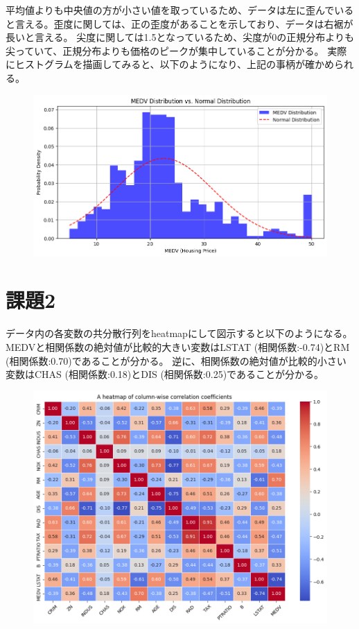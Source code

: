 \documentclass{jsarticle}
\begin{document}
平均値よりも中央値の方が小さい値を取っているため、データは左に歪んでいると言える。歪度に関しては、正の歪度があることを示しており、データは右裾が長いと言える。
尖度に関しては1.5となっているため、尖度が0の正規分布よりも尖っていて、正規分布よりも価格のピークが集中していることが分かる。
実際にヒストグラムを描画してみると、以下のようになり、上記の事柄が確かめられる。\\
\begin{figure}[H]
  \centering
  \includegraphics[width=15cm]{histogram.png}
\end{figure}

\section{課題2}
データ内の各変数の共分散行列をheatmapにして図示すると以下のようになる。 \\
MEDVと相関係数の絶対値が比較的大きい変数はLSTAT (相関係数:-0.74)とRM (相関係数:0.70)であることが分かる。
逆に、相関係数の絶対値が比較的小さい変数はCHAS (相関係数:0.18)とDIS (相関係数:0.25)であることが分かる。\\
\begin{figure}[H]
  \centering
  \includegraphics[width=15cm]{heatmap.png}
\end{figure}
\end{document}
